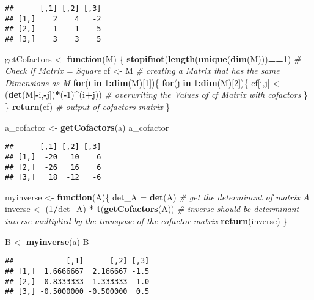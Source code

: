\documentclass[]{article}
\newenvironment{Shaded}{\begin{snugshade}}{\end{snugshade}}
\newcommand{\CommentTok}[1]{\textcolor[rgb]{0.56,0.35,0.01}{\textit{#1}}}
\newcommand{\ControlFlowTok}[1]{\textcolor[rgb]{0.13,0.29,0.53}{\textbf{#1}}}
\newcommand{\DecValTok}[1]{\textcolor[rgb]{0.00,0.00,0.81}{#1}}
\newcommand{\KeywordTok}[1]{\textcolor[rgb]{0.13,0.29,0.53}{\textbf{#1}}}
\newcommand{\NormalTok}[1]{#1}
\newcommand{\OperatorTok}[1]{\textcolor[rgb]{0.81,0.36,0.00}{\textbf{#1}}}
\newcommand{\StringTok}[1]{\textcolor[rgb]{0.31,0.60,0.02}{#1}}
\begin{document}
\begin{verbatim}
##      [,1] [,2] [,3]
## [1,]    2    4   -2
## [2,]    1   -1    5
## [3,]    3    3    5
\end{verbatim}

\begin{Shaded}
\begin{Highlighting}[]
\NormalTok{getCofactors <-}\StringTok{ }\ControlFlowTok{function}\NormalTok{(M) \{}
  \KeywordTok{stopifnot}\NormalTok{(}\KeywordTok{length}\NormalTok{(}\KeywordTok{unique}\NormalTok{(}\KeywordTok{dim}\NormalTok{(M)))}\OperatorTok{==}\DecValTok{1}\NormalTok{) }\CommentTok{# Check if Matrix = Square}
\NormalTok{  cf <-}\StringTok{ }\NormalTok{M }\CommentTok{# creating a Matrix that has the same Dimensions as M }
  \ControlFlowTok{for}\NormalTok{(i }\ControlFlowTok{in} \DecValTok{1}\OperatorTok{:}\KeywordTok{dim}\NormalTok{(M)[}\DecValTok{1}\NormalTok{])\{}
    \ControlFlowTok{for}\NormalTok{(j }\ControlFlowTok{in} \DecValTok{1}\OperatorTok{:}\KeywordTok{dim}\NormalTok{(M)[}\DecValTok{2}\NormalTok{])\{}
\NormalTok{      cf[i,j] <-}\StringTok{ }\NormalTok{(}\KeywordTok{det}\NormalTok{(M[}\OperatorTok{-}\NormalTok{i,}\OperatorTok{-}\NormalTok{j])}\OperatorTok{*}\NormalTok{(}\OperatorTok{-}\DecValTok{1}\NormalTok{)}\OperatorTok{^}\NormalTok{(i}\OperatorTok{+}\NormalTok{j)) }\CommentTok{# overwriting the Values of cf Matrix with cofactors}
\NormalTok{    \}}
\NormalTok{  \}}
  \KeywordTok{return}\NormalTok{(cf) }\CommentTok{# output of cofactors matrix}
\NormalTok{\}}

\NormalTok{a_cofactor <-}\StringTok{ }\KeywordTok{getCofactors}\NormalTok{(a)}
\NormalTok{a_cofactor}
\end{Highlighting}
\end{Shaded}

\begin{verbatim}
##      [,1] [,2] [,3]
## [1,]  -20   10    6
## [2,]  -26   16    6
## [3,]   18  -12   -6
\end{verbatim}

\begin{Shaded}
\begin{Highlighting}[]
\NormalTok{myinverse <-}\StringTok{ }\ControlFlowTok{function}\NormalTok{(A)\{}
\NormalTok{    det_A =}\StringTok{ }\KeywordTok{det}\NormalTok{(A) }\CommentTok{# get the determinant of matrix  A}
\NormalTok{    inverse <-}\StringTok{ }\NormalTok{(}\DecValTok{1}\OperatorTok{/}\NormalTok{det_A) }\OperatorTok{*}\StringTok{ }\KeywordTok{t}\NormalTok{(}\KeywordTok{getCofactors}\NormalTok{(A)) }\CommentTok{# inverse should be determinant inverse multiplied by the transpose of the cofactor matrix}
    \KeywordTok{return}\NormalTok{(inverse)}
\NormalTok{\}}

\NormalTok{B <-}\StringTok{ }\KeywordTok{myinverse}\NormalTok{(a)}
\NormalTok{B}
\end{Highlighting}
\end{Shaded}

\begin{verbatim}
##            [,1]      [,2] [,3]
## [1,]  1.6666667  2.166667 -1.5
## [2,] -0.8333333 -1.333333  1.0
## [3,] -0.5000000 -0.500000  0.5
\end{verbatim}
\end{document}
